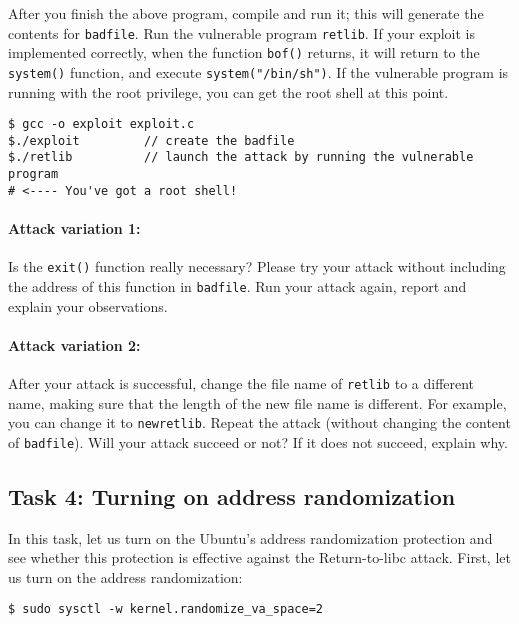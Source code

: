 After you finish the above program, compile and run it; this will
generate the contents for \texttt{badfile}. Run the vulnerable program 
\texttt{retlib}. If your exploit is implemented correctly, when the function
\texttt{bof()} returns, it will return to the \texttt{system()} function,
and execute \texttt{system("/bin/sh")}. If the vulnerable program is
running with the root privilege, you can get the root shell at this
point.

\begin{lstlisting}
$ gcc -o exploit exploit.c
$./exploit         // create the badfile
$./retlib          // launch the attack by running the vulnerable program
# <---- You've got a root shell! 
\end{lstlisting}




\paragraph{Attack variation 1:}
Is the \texttt{exit()} function really necessary? Please try 
your attack without including the address of this function in
\texttt{badfile}. Run your attack again, report and explain your
observations.  



\paragraph{Attack variation 2:} 
After your attack is successful, change the file name of \texttt{retlib}
to a different name, making sure that the length of the new 
file name is different. For example, you can change it to \texttt{newretlib}. 
Repeat the attack (without changing the content of {\tt badfile}). 
Will your attack succeed or not?  If it does not succeed, explain why.



\subsection{Task 4: Turning on address randomization}

In this task, let us turn on the Ubuntu's address randomization protection  
and see whether this protection is effective against 
the Return-to-libc attack. First, let us 
turn on the address randomization:  

\begin{lstlisting}
$ sudo sysctl -w kernel.randomize_va_space=2
\end{lstlisting}


